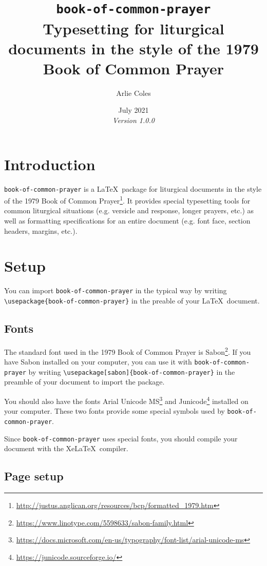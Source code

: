 \documentclass{article}
\title{\texttt{book-of-common-prayer}\\
	   \Large Typesetting for liturgical documents in the style of the 1979 Book of Common Prayer \\
	   }
\date{July 2021 \\ \textit{Version 1.0.0}}
\author{Arlie Coles}
\begin{document}
\maketitle

\section{Introduction}

\texttt{book-of-common-prayer} is a \LaTeX\ package for liturgical documents in the style of the 1979 Book of Common Prayer\footnote{\url{http://justus.anglican.org/resources/bcp/formatted_1979.htm}}. It provides special typesetting tools for common liturgical situations (e.g. versicle and response, longer prayers, etc.) as well as formatting specifications for an entire document (e.g. font face, section headers, margins, etc.).

\section{Setup}

You can import \texttt{book-of-common-prayer} in the typical way by writing \lstinline|\usepackage{book-of-common-prayer}| in the preable of your \LaTeX\ document.

\subsection{Fonts}

The standard font used in the 1979 Book of Common Prayer is Sabon\footnote{\url{https://www.linotype.com/5598633/sabon-family.html}}. If you have Sabon installed on your computer, you can use it with \texttt{book-of-common-prayer} by writing \lstinline|\usepackage[sabon]{book-of-common-prayer}| in the preamble of your document to import the package.

You should also have the fonts Arial Unicode MS\footnote{\url{https://docs.microsoft.com/en-us/typography/font-list/arial-unicode-ms}} and Junicode\footnote{\url{https://junicode.sourceforge.io/}} installed on your computer. These two fonts provide some special symbols used by \texttt{book-of-common-prayer}.

Since \texttt{book-of-common-prayer} uses special fonts, you should compile your document with the Xe\LaTeX\ compiler.

\subsection{Page setup}
\end{document}
